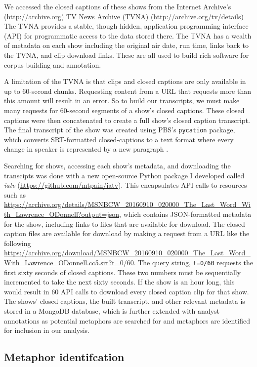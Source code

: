 We accessed the closed captions of these shows from the 
Internet Archive's (\url{http://archive.org}) 
TV News Archive (TVNA) (\url{http://archive.org/tv/details}) 
The TVNA provides a stable, though hidden, application programming interface
(API) for programmatic access to the data stored there. 
The TVNA has a wealth of metadata on each show including the original air date, 
run time, links back to the TVNA, and clip download links. These are all used to 
build rich software for corpus building and annotation. 

A limitation of the TVNA is that clips and closed captions are only available
in up to 60-second chunks. 
Requesting content from a URL that requests more than this amount will result
in an error. So to build our transcripts, we must make many requests for 
60-second segments of a show's closed captions. These closed captions were then
concatenated to create a full show's closed caption transcript. The final 
transcript of the show was created using PBS's \texttt{pycation} package, which
converts SRT-formatted closed-captions to a text format where every change in
speaker is represented by a new paragraph \cite{PBS2016, Matroska2016}. 

Searching for shows, accessing each show's metadata, and downloading the 
transcipts was done with a new open-source Python package I developed 
called \textit{iatv} (\url{https://github.com/mtpain/iatv}).
This encapsulates API calls to resources such as 
\url{https://archive.org/details/MSNBCW\_20160910\_020000\_The\_Last\_Word\_With\_Lawrence\_ODonnell?output=json}, which contains JSON-formatted metadata for the show, including
links to files that are available for download. The closed-caption files are
available for download by making a request from a URL like the following
\url{https://archive.org/download/MSNBCW\_20160910\_020000\_The\_Last\_Word\_With\_Lawrence\_ODonnell.cc5.srt?t=0/60}.
The query string, \texttt{t=0/60} requests the first sixty seconds of closed
captions. These two numbers must be sequentially incremented to take the
next sixty seconds. If the show is an hour long, this would result in 60 API
calls to download every closed caption clip for that show. The shows' closed
captions, the built transcript, and other relevant metadata is stored in a
MongoDB database, which is further extended with analyst annotations as
potential metaphors are searched for and metaphors are identified for 
inclusion in our analysis.


\subsection{Metaphor identifcation}
\label{sub:metaphor-identifcation}

